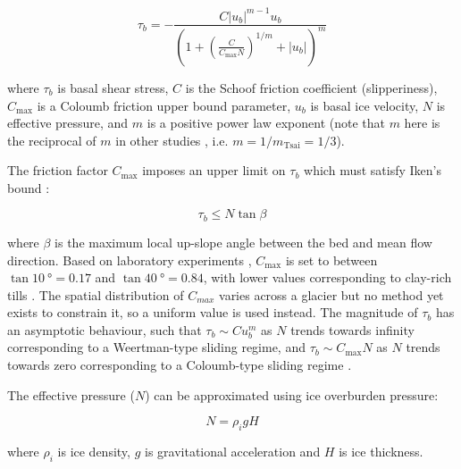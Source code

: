\begin{equation}
  \tau_b = -\frac{C |u_b|^{m-1} u_b}{\left(1 + \left(\frac{C}{C_{\text{max}}N}\right)^{1/m} + |u_b|\right)^m} \label{eq:schoof}
\end{equation}

where $\tau_b$ is basal shear stress, $C$ is the Schoof friction coefficient (slipperiness), $C_{\text{max}}$ is a Coloumb friction upper bound parameter, $u_b$ is basal ice velocity, $N$ is effective pressure, and $m$ is a positive power law exponent (note that $m$ here is the reciprocal of $m$ in other studies \citep[e.g.][]{TsaiMarineicesheetprofiles2015}, i.e. $m = 1/m_{\text{Tsai}} = 1/3$).

The friction factor $C_{\text{max}}$ imposes an upper limit on $\tau_b$ which must satisfy Iken's bound \citep{IkenEffectSubglacialWater1981,GagliardiniFiniteelementmodelingsubglacial2007}:

\begin{equation}
  \tau_b \leq N\tan\beta
\end{equation}

where $\beta$ is the maximum local up-slope angle between the bed and mean flow direction.
Based on laboratory experiments \citep{IversonRingshearstudiestill1998}, $C_{\text{max}}$ is set to between $\tan \SI{10}{\degree} = 0.17$ and $\tan \SI{40}{\degree} = 0.84$, with lower values corresponding to clay-rich tills \citep[, pp.266-267]{Cuffeyphysicsglaciers2010}.
The spatial distribution of $C_{max}$ varies across a glacier but no method yet exists to constrain it, so a uniform value \citep[0.4 and 0.6 in][]{BrondexSensitivitycentennialmass2019} is used instead.
The magnitude of $\tau_b$ has an asymptotic behaviour, such that $\tau_b \sim C u_b^m$ as $N$ trends towards infinity corresponding to a Weertman-type sliding regime, and $\tau_b \sim C_{\text{max}} N$ as $N$ trends towards zero corresponding to a Coloumb-type sliding regime \citep{BrondexSensitivitygroundingline2017}.

The effective pressure ($N$) can be approximated using ice overburden pressure:

\begin{equation}
  N = \rho_i g H
\end{equation}

where $\rho_i$ is ice density, $g$ is gravitational acceleration and $H$ is ice thickness.


